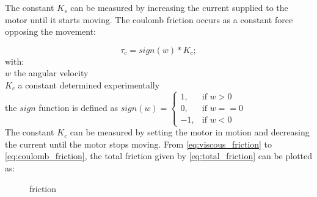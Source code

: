 The constant $K_s$ can be measured by increasing the current supplied to the motor until it starts moving. 
The coulomb friction occurs as a constant force opposing the movement:

\begin{equation}
\tau_c = sign(w)*K_c;
\label{eq:coulomb_friction}
\end{equation}
with:\\
\hspace*{8mm}$w$ the angular velocity\\
\hspace*{8mm}$K_c$ a constant determined experimentally\\
\hspace*{8mm}the $sign$ function is defined as $sign(w) = \begin{cases} 1, & \mbox{if } w > 0 \\ 0, & \mbox{if } w == 0 \\ -1, & \mbox{if } w < 0\end{cases}$\\

The constant $K_c$ can be measured by setting the motor in motion and decreasing the current until the motor stops moving.
From \eqref{eq:viscous_friction} to \eqref{eq:coulomb_friction}, the total friction given by \eqref{eq:total_friction} can be plotted as:

\begin{figure}[h]
\centering
\caption{friction}
\end{figure}


